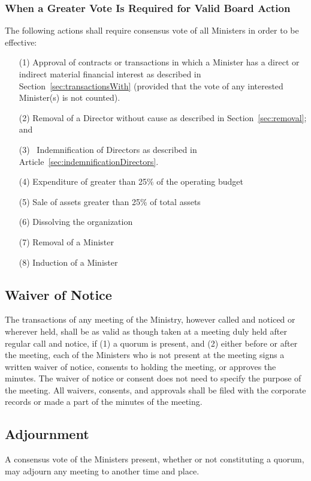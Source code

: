 \documentclass[letterpaper,titlepage]{article}
\begin{document}
\subsubsection{When a Greater Vote Is Required for Valid Board Action}
\label{sec:whenGreater}
The following actions shall require consensus vote of all Ministers in order to
be effective:
\begin{itemize}
    \item[(1)] Approval of contracts or transactions in which a Minister has a
        direct or indirect material financial interest as described in
        Section~\ref{sec:transactionsWith} (provided that the vote of any
        interested Minister(s) is not counted).
    \item[(2)] Removal of a Director without cause as described in
        Section~\ref{sec:removal}; and  
    \item[(3)] Indemnification of Directors as described in
        Article~\ref{sec:indemnificationDirectors}. 
    \item[(4)] Expenditure of greater than 25\% of the operating budget
    \item[(5)] Sale of assets greater than 25\% of total assets
    \item[(6)] Dissolving the organization
    \item[(7)] Removal of a Minister
    \item[(8)] Induction of a Minister
\end{itemize}
\subsection{Waiver of Notice}
\label{sec:waiverNotice}
The transactions of any meeting of the Ministry, however called and noticed or
wherever held, shall be as valid as though taken at a meeting duly held after
regular call and notice, if (1) a quorum is present, and (2) either before or
after the meeting, each of the Ministers who is not present at the meeting
signs a written waiver of notice, consents to holding the meeting, or approves
the minutes. The waiver of notice or consent does not need to specify the
purpose of the meeting. All waivers, consents, and approvals shall be filed
with the corporate records or made a part of the minutes of the meeting.
\subsection{Adjournment}
\label{sec:adjournment}
A consensus vote of the Ministers present, whether or not constituting a
quorum, may adjourn any meeting to another time and place.
\end{document}
